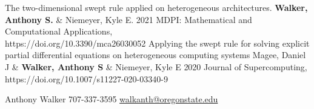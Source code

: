 \documentclass[lighthipster]{simplehipstercv}
\newlength{\rightcolwidth}
\begin{document}
\begin{paracol}{2}
\publication
{The two-dimensional swept rule applied on heterogeneous architectures.} %
{\textbf{Walker, Anthony S.} \& Niemeyer,  Kyle E.} %
{2021} %
{MDPI: Mathematical and Computational Applications,\\ https://doi.org/10.3390/mca26030052} %
{} %
\publication
{Applying the swept rule for solving explicit partial differential equations on heterogeneous computing systems} %
{Magee, Daniel J \& \textbf{Walker, Anthony S} \& Niemeyer, Kyle E} %
{2020} %
{Journal of Supercomputing,\\ https://doi.org/10.1007/s11227-020-03340-9} %
{} %





 

\vfill{} %

\setlength{\parindent}{0pt}
\begin{minipage}[t]{\rightcolwidth}
\begin{center}\fontfamily{\sfdefault}\selectfont \color{black!70}
 {\small Anthony Walker  707-337-3595  \protect\url{walkanth@oregonstate.edu}
}
\end{center}
\end{minipage}

\end{paracol}
\end{document}
